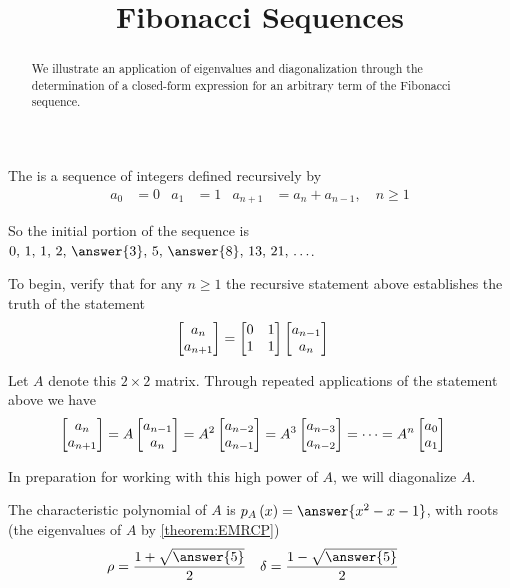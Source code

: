 \documentclass{ximera}
\title{Fibonacci Sequences}
\begin{document}
\begin{abstract}
  We illustrate an application of eigenvalues and diagonalization
  through the determination of a closed-form expression for an
  arbitrary term of the Fibonacci sequence.
\end{abstract}
\maketitle

\begin{example}

The  is a sequence of integers defined recursively by
\begin{align*}
a_0&=0
&
a_1&=1
&
a_{n+1}&=a_n+a_{n-1},\quad n\geq 1
\end{align*}

\begin{question}
So the initial portion of the sequence is $0,\,1,\,1,\,2,\,\answer{3},\,5,\,\answer{8},\,13,\,21,\,\ldots$.  
\end{question}

To begin, verify that for any $n\geq 1$ the recursive statement above establishes the truth of the statement
\begin{align*}
\begin{bmatrix}a_n\\a_{n+1}\end{bmatrix}
&=
\begin{bmatrix}0&1\\1&1\end{bmatrix}
\begin{bmatrix}a_{n-1}\\a_n\end{bmatrix}
\end{align*}

Let $A$ denote this $2\times 2$ matrix.  Through repeated applications of the statement above we have
\begin{align*}
\begin{bmatrix}a_n\\a_{n+1}\end{bmatrix}
&
=A\begin{bmatrix}a_{n-1}\\a_n\end{bmatrix}
=A^2\begin{bmatrix}a_{n-2}\\a_{n-1}\end{bmatrix}
=A^3\begin{bmatrix}a_{n-3}\\a_{n-2}\end{bmatrix}
=\cdots
=A^n\begin{bmatrix}a_{0}\\a_{1}\end{bmatrix}
\end{align*}

In preparation for working with this high power of $A$, we will
diagonalize $A$.

\begin{question}
The characteristic polynomial of $A$ is
$\charpoly{A}{x}=\answer{x^2-x-1}$, with roots (the eigenvalues of $A$ by
\ref{theorem:EMRCP})
\begin{align*}
\rho&=\frac{1+\sqrt{\answer{5}}}{2}
&
\delta&=\frac{1-\sqrt{\answer{5}}}{2}
\end{align*}


\end{question}
\end{example}
\end{document}
